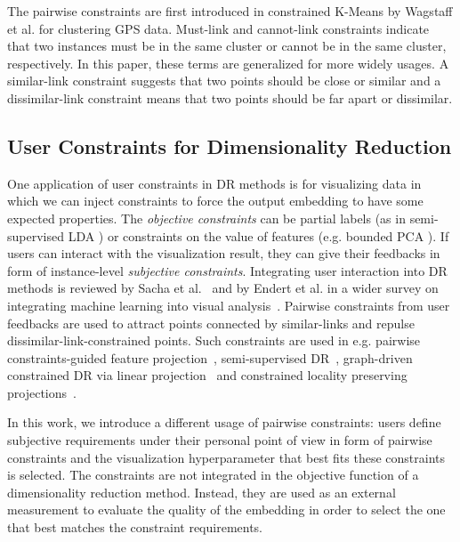 The pairwise constraints are first introduced in constrained K-Means by Wagstaff et al. \cite{wagstaff2001constrained} for clustering GPS data. Must-link and cannot-link constraints indicate that two instances must be in the same cluster or cannot be in the same cluster, respectively.
In this paper, these terms are generalized for more widely usages. A similar-link constraint suggests that two points should be close or similar and a dissimilar-link constraint means that two points should be far apart or dissimilar.

\subsection{User Constraints for Dimensionality Reduction}\label{subsec:constraints_dr}
One application of user constraints in DR methods is for visualizing data in which we can inject constraints to force the output embedding to have some expected properties.
The \emph{objective constraints} can be partial labels (as in semi-supervised LDA \cite{Sugiyama2008SELF}) or constraints on the value of features (e.g. bounded PCA \cite{giordani2007bpca}). 
If users can interact with the visualization result, they can give their feedbacks in form of instance-level \emph{subjective constraints}.
Integrating user interaction into DR methods is reviewed by Sacha et al.~\cite{Sacha2017Interaction} and by Endert et al. in a wider survey on integrating machine learning into visual analysis~\cite{Endert2017SOTA}.
Pairwise constraints from user feedbacks are used to attract points connected by similar-links and repulse dissimilar-link-constrained points. Such constraints are used in e.g. pairwise constraints-guided feature projection~\cite{tang2007pairwise}, semi-supervised DR~\cite{zhang2007ssdr}, graph-driven constrained DR via linear projection~\cite{davidson2009gcdr} and constrained locality preserving projections~\cite{cevikalp2008CLPP}.

In this work, we introduce a different usage of pairwise constraints: users define subjective requirements under their personal point of view in form of pairwise constraints and the visualization hyperparameter that best fits these constraints is selected.
The constraints are not integrated in the objective function of a dimensionality reduction method.
Instead, they are used as an external measurement to evaluate the quality of the embedding in order to select the one that best matches the constraint requirements.


